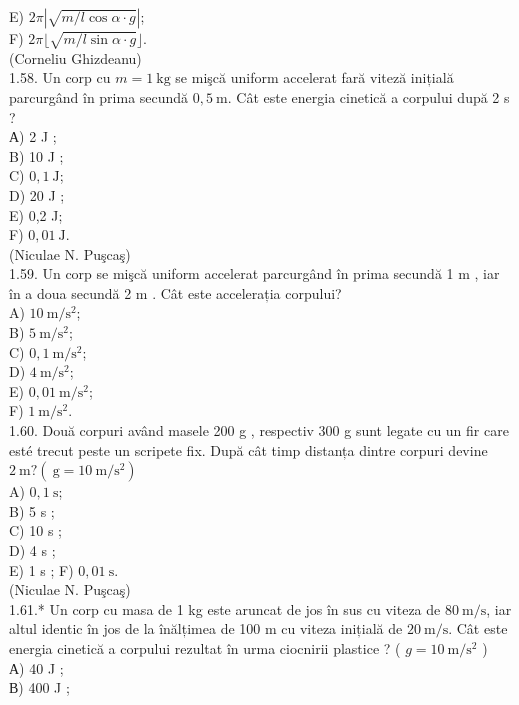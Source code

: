 \documentclass[10pt]{article}
\begin{document}
E) $2 \pi|\sqrt{m / l \cos \alpha \cdot g}|$;\\
F) $2 \pi\lfloor\sqrt{m / l \sin \alpha \cdot g}\rfloor$.\\
(Corneliu Ghizdeanu)\\
1.58. Un corp cu $m=1 \mathrm{~kg}$ se mişcă uniform accelerat fară viteză inițială parcurgând în prima secundă $0,5 \mathrm{~m}$. Cât este energia cinetică a corpului după 2 s ?\\
А) 2 J ;\\
B) 10 J ;\\
C) $0,1 \mathrm{~J}$;\\
D) 20 J ;\\
E) 0,2 J;\\
F) $0,01 \mathrm{~J}$.\\
(Niculae N. Puşcaş)\\
1.59. Un corp se mişcă uniform accelerat parcurgând în prima secundă 1 m , iar în a doua secundă 2 m . Cât este accelerația corpului?\\
A) $10 \mathrm{~m} / \mathrm{s}^{2}$;\\
B) $5 \mathrm{~m} / \mathrm{s}^{2}$;\\
C) $0,1 \mathrm{~m} / \mathrm{s}^{2}$;\\
D) $4 \mathrm{~m} / \mathrm{s}^{2}$;\\
E) $0,01 \mathrm{~m} / \mathrm{s}^{2}$;\\
F) $1 \mathrm{~m} / \mathrm{s}^{2}$.\\
1.60. Două corpuri având masele 200 g , respectiv 300 g sunt legate cu un fir care esté trecut peste un scripete fix. După cât timp distanța dintre corpuri devine $2 \mathrm{~m} ?\left(\mathrm{~g}=10 \mathrm{~m} / \mathrm{s}^{2}\right)$\\
A) $0,1 \mathrm{~s}$;\\
B) 5 s ;\\
C) 10 s ;\\
D) 4 s ;\\
E) 1 s ; F) $0,01 \mathrm{~s}$.\\
(Niculae N. Puşcaş)\\
1.61.* Un corp cu masa de 1 kg este aruncat de jos în sus cu viteza de $80 \mathrm{~m} / \mathrm{s}$, iar altul identic în jos de la înălțimea de 100 m cu viteza inițială de $20 \mathrm{~m} / \mathrm{s}$. Cât este energia cinetică a corpului rezultat în urma ciocnirii plastice ? ( $g=10 \mathrm{~m} / \mathrm{s}^{2}$ )\\
А) 40 J ;\\
В) 400 J ;\\
\end{document}
